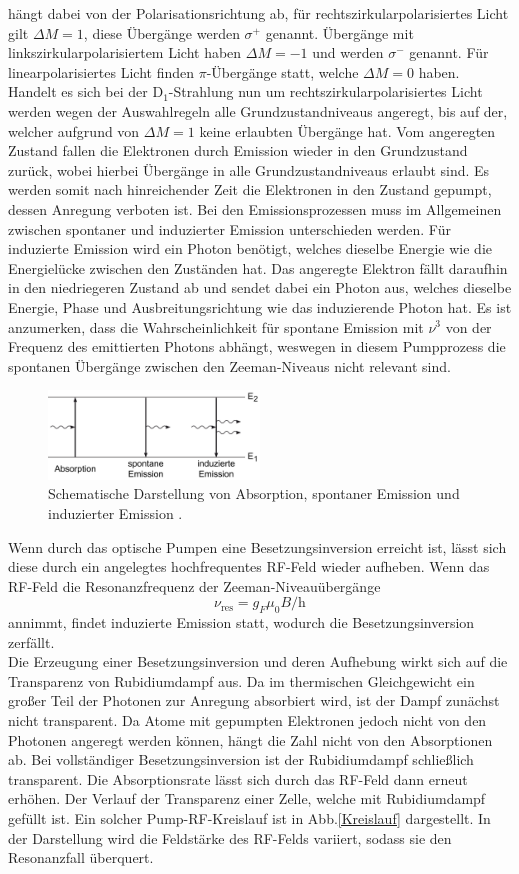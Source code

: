  hängt dabei von der Polarisationsrichtung ab, für rechtszirkularpolarisiertes Licht gilt $\Delta M=1$, diese Übergänge werden $\sigma^+$ genannt. Übergänge mit linkszirkularpolarisiertem Licht haben $\Delta M=-1$ und werden $\sigma^-$ genannt.
Für linearpolarisiertes Licht finden $\pi$-Übergänge statt, welche $\Delta M=0$ haben. Handelt es sich bei der D$_1$-Strahlung nun um rechtszirkularpolarisiertes Licht werden wegen der Auswahlregeln alle Grundzustandniveaus angeregt, bis auf der, welcher aufgrund von $\Delta M=1$ keine erlaubten Übergänge hat. Vom angeregten Zustand fallen die Elektronen durch Emission wieder in den Grundzustand zurück, wobei hierbei Übergänge in alle Grundzustandniveaus erlaubt sind. Es werden somit nach hinreichender Zeit die Elektronen in den Zustand gepumpt, dessen Anregung verboten ist.
Bei den Emissionsprozessen muss im Allgemeinen zwischen spontaner und induzierter Emission unterschieden werden. Für induzierte Emission wird ein Photon benötigt, welches dieselbe Energie wie die Energielücke zwischen den Zuständen hat. Das angeregte Elektron fällt daraufhin in den niedriegeren Zustand ab und sendet dabei ein Photon aus, welches dieselbe Energie, Phase und Ausbreitungsrichtung wie das induzierende Photon hat.
Es ist anzumerken, dass die Wahrscheinlichkeit für spontane Emission mit $\nu^3$ von der Frequenz des emittierten Photons abhängt, weswegen in diesem Pumpprozess die spontanen Übergänge zwischen den Zeeman-Niveaus nicht relevant sind.
\begin{figure}
  \centering
  \includegraphics[width=0.5\textwidth]{Bilder/Emission}
  \caption{Schematische Darstellung von Absorption, spontaner Emission und induzierter Emission \cite{Emission}.}
\end{figure}
Wenn durch das optische Pumpen eine Besetzungsinversion erreicht ist, lässt sich diese durch ein angelegtes hochfrequentes RF-Feld wieder aufheben. Wenn das RF-Feld die Resonanzfrequenz der Zeeman-Niveauübergänge
\begin{equation}
  \nu_{\text{res}}=g_F\mu_0B/\text{h}
\end{equation}
annimmt, findet induzierte Emission statt, wodurch die Besetzungsinversion zerfällt.\\
Die Erzeugung einer Besetzungsinversion und deren Aufhebung wirkt sich auf die Transparenz von Rubidiumdampf aus. Da im thermischen Gleichgewicht ein großer Teil der Photonen zur Anregung absorbiert wird, ist der Dampf zunächst nicht transparent. Da Atome mit gepumpten Elektronen jedoch nicht von den Photonen angeregt werden können, hängt die Zahl nicht von den Absorptionen ab. Bei vollständiger Besetzungsinversion ist der Rubidiumdampf schließlich transparent. Die Absorptionsrate lässt sich durch das RF-Feld dann erneut erhöhen. Der Verlauf der Transparenz einer Zelle, welche mit Rubidiumdampf gefüllt ist. Ein solcher Pump-RF-Kreislauf ist in Abb.\ref{Kreislauf} dargestellt. In der Darstellung wird die Feldstärke des RF-Felds variiert, sodass sie den Resonanzfall überquert.
